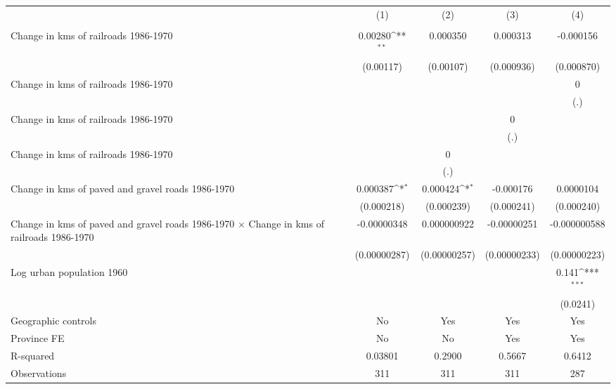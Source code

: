 {
\def\sym#1{\ifmmode^{#1}\else\(^{#1}\)\fi}
\begin{tabular}{l*{4}{c}}
\hline\hline
                &\multicolumn{1}{c}{(1)}&\multicolumn{1}{c}{(2)}&\multicolumn{1}{c}{(3)}&\multicolumn{1}{c}{(4)}\\
                &\multicolumn{1}{c}{}&\multicolumn{1}{c}{}&\multicolumn{1}{c}{}&\multicolumn{1}{c}{}\\
\hline
Change in kms of railroads 1986-1970&  0.00280\sym{**} & 0.000350         & 0.000313         &-0.000156         \\
                &(0.00117)         &(0.00107)         &(0.000936)         &(0.000870)         \\
[1em]
Change in kms of railroads 1986-1970&                  &                  &                  &        0         \\
                &                  &                  &                  &      (.)         \\
[1em]
Change in kms of railroads 1986-1970&                  &                  &        0         &                  \\
                &                  &                  &      (.)         &                  \\
[1em]
Change in kms of railroads 1986-1970&                  &        0         &                  &                  \\
                &                  &      (.)         &                  &                  \\
[1em]
Change in kms of paved and gravel roads 1986-1970& 0.000387\sym{*}  & 0.000424\sym{*}  &-0.000176         &0.0000104         \\
                &(0.000218)         &(0.000239)         &(0.000241)         &(0.000240)         \\
[1em]
Change in kms of paved and gravel roads 1986-1970 $\times$ Change in kms of railroads 1986-1970&-0.00000348         &0.000000922         &-0.00000251         &-0.000000588         \\
                &(0.00000287)         &(0.00000257)         &(0.00000233)         &(0.00000223)         \\
[1em]
Log urban population 1960&                  &                  &                  &    0.141\sym{***}\\
                &                  &                  &                  & (0.0241)         \\
\hline
Geographic controls&       No         &      Yes         &      Yes         &      Yes         \\
Province FE     &       No         &       No         &      Yes         &      Yes         \\
R-squared       &  0.03801         &   0.2900         &   0.5667         &   0.6412         \\
Observations    &      311         &      311         &      311         &      287         \\
\hline\hline
\end{tabular}
}
